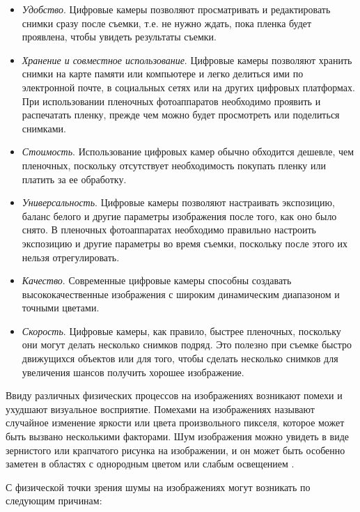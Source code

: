 \begin{itemize}
    \item \textit{Удобство}. Цифровые камеры позволяют просматривать и редактировать снимки сразу после съемки, т.е. не нужно ждать, пока пленка будет проявлена, чтобы увидеть результаты съемки.
    \item \textit{Хранение и совместное использование}. Цифровые камеры позволяют хранить снимки на карте памяти или компьютере и легко делиться ими по электронной почте, в социальных сетях или на других цифровых платформах. При использовании пленочных фотоаппаратов необходимо проявить и распечатать пленку, прежде чем можно будет просмотреть или поделиться снимками.
    \item \textit{Стоимость}. Использование цифровых камер обычно обходится дешевле, чем пленочных, поскольку отсутствует необходимость покупать пленку или платить за ее обработку.
    \item \textit{Универсальность}. Цифровые камеры позволяют настраивать экспозицию, баланс белого и другие параметры изображения после того, как оно было снято. В пленочных фотоаппаратах необходимо правильно настроить экспозицию и другие параметры во время съемки, поскольку после этого их нельзя отрегулировать.
    \item \textit{Качество}. Современные цифровые камеры способны создавать высококачественные изображения с широким динамическим диапазоном и точными цветами.
    \item \textit{Скорость}. Цифровые камеры, как правило, быстрее пленочных, поскольку они могут делать несколько снимков подряд. Это полезно при съемке быстро движущихся объектов или для того, чтобы сделать несколько снимков для увеличения шансов получить хорошее изображение.
\end{itemize}

Ввиду различных физических процессов на изображениях возникают помехи и ухудшают визуальное восприятие. Помехами на изображениях называют случайное изменение яркости или цвета произвольного пикселя, которое может быть вызвано несколькими факторами. Шум изображения можно увидеть в виде зернистого или крапчатого рисунка на изображении, и он может быть особенно заметен в областях с однородным цветом или слабым освещением \cite{basicnoise}.

С физической точки зрения шумы на изображениях могут возникать по следующим причинам\cite{noisephysics}:

